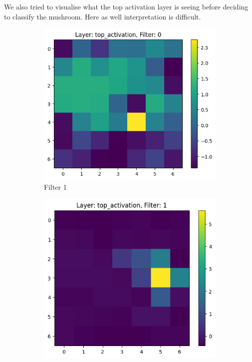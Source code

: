 We also tried to visualise what the top activation layer is seeing before deciding to classify the mushroom. Here as well interpretation is difficult.
\begin{figure}[h]
    \centering
    \begin{subfigure}[b]{0.3\textwidth}
        \centering
        \includegraphics[width=\textwidth]{images/filter0 top_activation.png}
        \caption{Filter 1}
        \label{fig:filter1}
    \end{subfigure}
    \begin{subfigure}[b]{0.3\textwidth}
        \centering
        \includegraphics[width=\textwidth]{images/filter1 top_activation.png}

\end{subfigure}
\end{figure}

